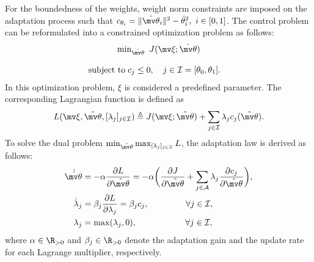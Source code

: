 \documentclass[letterpaper, 10 pt, conference]{ieeeconf}  %
\begin{document}
For the boundedness of the weights, weight norm constraints are imposed on the adaptation process such that $c_{\theta_i}=\Vert{\hat{\mv\theta}}_i\Vert^2-\bar\theta^2_i,\ i\in[0,1]$.
The control problem can be reformulated into a constrained optimization problem as follows:
\begin{equation}
    \begin{matrix}
        \min_{{\hat{\mv\theta}}} \ J(\mv \xi;{\hat{\mv\theta}})
        \\ \\
        \begin{aligned}
        \text{subject to\;}&c_{j}\le0, \quad j\in\mathcal I = [\theta_0,\theta_1].
        \end{aligned}
    \end{matrix}
\end{equation}
In this optimization problem, $\xi$ is considered a predefined parameter.
The corresponding Lagrangian function is defined as
\begin{equation}
    L(
        \mv \xi,
        {\hat{\mv\theta}},
        [\lambda_j]_{j\in\mathcal I}
    )
    \triangleq 
    J(\mv \xi;{\hat{\mv\theta}})
    +
    \sum_{j\in\mathcal I} \lambda_jc_j({\hat{\mv\theta}})
    .
\end{equation}
To solve the dual problem $\min_{{\hat{\mv\theta}}} \max_{[\lambda_j]_{j\in\mathcal I}}  L$, the adaptation law is derived as follows:
\begin{align}
        \dot {{\hat{\mv\theta}}}&=-\alpha {\partial L\over\partial {\hat{\mv\theta}}}
        =-\alpha 
        \bigg(
        {\partial J\over \partial {\hat{\mv\theta}}}+\sum_{j\in\mathcal{A}}
        \lambda_j {\partial c_j\over \partial {\hat{\mv\theta}}}
        \bigg),
    \label{eq. adaptation law th}
        \\
        \dot\lambda_j& = \beta_j{\partial L\over\partial \lambda_j} = \beta_j c_j ,
        \quad\quad\quad\quad      \      
        \forall j\in\mathcal I,
    \label{eq. adaptation law L}
        \\
        \lambda_j & = \max(\lambda_j,0) ,
        \quad\quad\quad\quad\ \ \ \ \ 
        \forall j\in\mathcal I,
    \label{eq. adaptation law L max}
\end{align}
where $\alpha\in\R_{>0}$ and $\beta_j\in\R_{>0}$ denote the adaptation gain and the update rate for each Lagrange multiplier, respectively.
\color{red}
\color{black}
\end{document}
